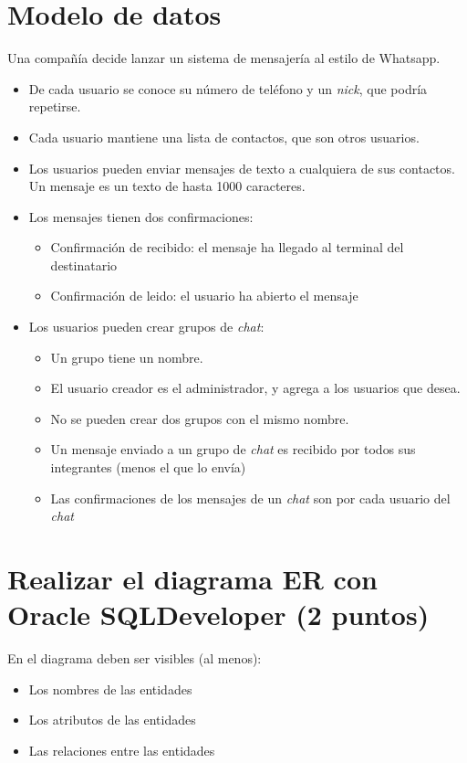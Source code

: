 \documentclass[a4paper]{article}
\begin{document}
\section{Modelo de datos}
\label{sec:org0000003}
Una compañía decide lanzar un sistema de mensajería al estilo de Whatsapp.
\begin{itemize}
\item De cada usuario se conoce su número de teléfono y un \emph{nick}, que podría repetirse.
\item Cada usuario mantiene una lista de contactos, que son otros usuarios.
\item Los usuarios pueden enviar mensajes de texto a cualquiera de sus contactos. Un mensaje es un texto de hasta 1000 caracteres.
\item Los mensajes tienen dos confirmaciones:
\begin{itemize}
\item Confirmación de recibido: el mensaje ha llegado al terminal del destinatario
\item Confirmación de leido: el usuario ha abierto el mensaje
\end{itemize}
\end{itemize}



\begin{itemize}
\item Los usuarios pueden crear grupos de \emph{chat}:
\begin{itemize}
\item Un grupo tiene un nombre.
\item El usuario creador es el administrador, y agrega a los usuarios que desea.
\item No se pueden crear dos grupos con el mismo nombre.
\item Un mensaje enviado a un grupo de \emph{chat} es recibido por todos sus integrantes (menos el que lo envía)
\item Las confirmaciones de los mensajes de un \emph{chat} son por cada usuario del \emph{chat}
\end{itemize}
\end{itemize}


\section{Realizar el diagrama \textbf{ER} con Oracle \textbf{SQLDeveloper} (2 puntos)}
\label{sec:org0000006}
En el diagrama deben ser visibles (al menos):
\begin{itemize}
\item Los nombres de las entidades
\item Los atributos de las entidades
\item Las relaciones entre las entidades
\end{itemize}
\end{document}
